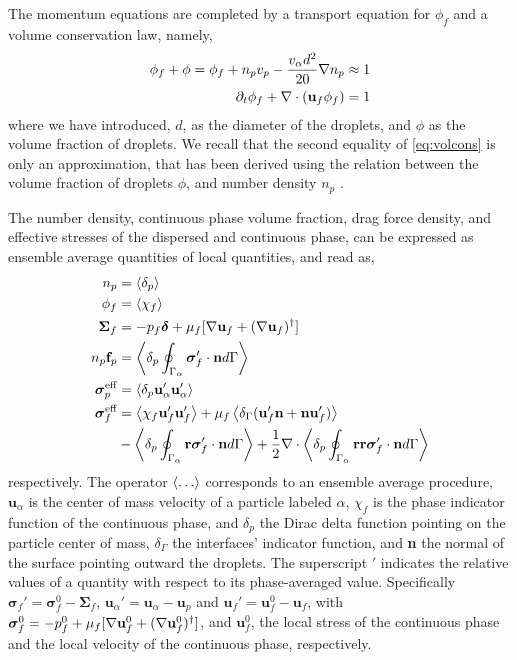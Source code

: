 The momentum equations are completed by a transport equation for $\phi_f$ and a volume conservation law, namely, 
\begin{align}
    \label{eq:volcons}
    \phi_f+\phi= \phi_f + n_pv_p  - \frac{v_\alpha d^2 }{20}\grad n_p \approx 1\\
    \pddt \phi_f + \div (\textbf{u}_f \phi_f)= 1
\end{align}
where we have introduced, $d$, as the diameter of the droplets, and $\phi$ as the volume fraction of droplets. 
We recall that the second equality of \ref{eq:volcons} is only an approximation, that has been derived using the relation between the volume fraction of droplets $\phi$, and number density $n_p$ \citep{zhang1997momentum}. 

The number density, continuous phase volume fraction, drag force density, and effective stresses of the dispersed and continuous phase, can be expressed as ensemble average quantities of local quantities, and read as, 
\begin{align}
    n_p &= \pavg{}
    \label{eq:n_p}\\
    \phi_f &= \avg{\chi_f}
    \label{eq:chi_f}\\
    \bm\Sigma_f &= - p_f \bm\delta + \mu_f [\grad \textbf{u}_f +  (\grad \textbf{u}_f)^\dagger ] 
    \label{eq:sigma_f}\\
    n_p \textbf{f}_p  &= \pSavg{\bm\sigma'_f\cdot \textbf{n}}
    \label{eq:f_alpha}
    \\
    \bm{\sigma}_p^{\text{eff}} &= \pavg{\textbf{u}_\alpha'\textbf{u}_\alpha'}
    \label{eq:def_uup}
    \\
    \bm{\sigma}^{\text{eff}}_f 
    &= \avg{\chi_f \textbf{u}_f'\textbf{u}_f'} 
    + \mu_f \avg{\delta_\Gamma (\textbf{u}_f' \textbf{n}+ \textbf{n}\textbf{u}_f')} \nonumber \\
    &- \pSavg{\textbf{r}\bm\sigma'_f\cdot \textbf{n}}
    + \frac{1}{2}\div\pSavg{\textbf{rr}\bm\sigma'_f\cdot \textbf{n}}
    \label{eq:def_sigma_eff_f}
\end{align}
respectively. 
The operator $\left<\ldots\right>$ corresponds to an ensemble average procedure, 
$\textbf{u}_\alpha$ is the center of mass velocity of a particle labeled $\alpha$, $\chi_f$ is the phase indicator function of the continuous phase, and $\delta_p$ the Dirac delta function pointing on the particle center of mass, $\delta_\Gamma$ the interfaces' indicator function, and \textbf{n} the normal of the surface pointing outward the droplets. 
The superscript $'$ indicates the relative values of a quantity with respect to its phase-averaged value. 
Specifically $\bm{\sigma}_f' = \bm{\sigma}_f^0  - \bm{\Sigma}_f$, 
$\textbf{u}_\alpha' = \textbf{u}_\alpha - \textbf{u}_p$ and $\textbf{u}_f' = \textbf{u}_f^0  -\textbf{u}_f$, with $\bm{\sigma}_f^0 = -p_f^0 + \mu_f [\mathbf{\nabla} \textbf{u}_f^0 + (\mathbf{\nabla} \textbf{u}_f^0)^\dagger] $, and $\textbf{u}_f^0$, the local stress of the continuous phase and the local velocity of the continuous phase, respectively. 

